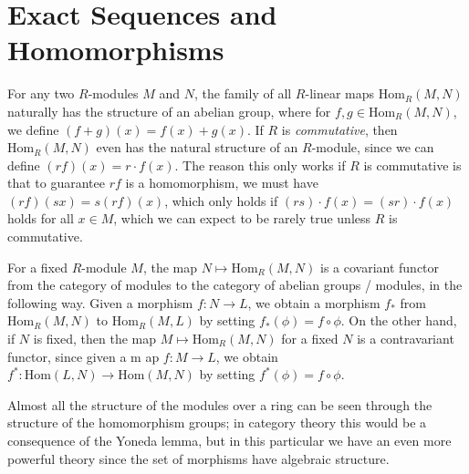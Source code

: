 \section{Exact Sequences and Homomorphisms}

For any two $R$-modules $M$ and $N$, the family of all $R$-linear maps $\text{Hom}_R(M,N)$ naturally has the structure of an abelian group, where for $f,g \in \text{Hom}_R(M,N)$, we define $(f + g)(x) = f(x) + g(x)$. If $R$ is \emph{commutative}, then $\text{Hom}_R(M,N)$ even has the natural structure of an $R$-module, since we can define $(rf)(x) = r \cdot f(x)$. The reason this only works if $R$ is commutative is that to guarantee $rf$ is a homomorphism, we must have $(rf)(sx) = s(rf)(x)$, which only holds if $(rs) \cdot f(x) = (sr) \cdot f(x)$ holds for all $x \in M$, which we can expect to be rarely true unless $R$ is commutative.

For a fixed $R$-module $M$, the map $N \mapsto \text{Hom}_R(M,N)$ is a covariant functor from the category of modules to the category of abelian groups / modules, in the following way. Given a morphism $f: N \to L$, we obtain a morphism $f_*$ from $\text{Hom}_R(M,N)$ to $\text{Hom}_R(M,L)$ by setting $f_*(\phi) = f \circ \phi$. On the other hand, if $N$ is fixed, then the map $M \mapsto \text{Hom}_R(M,N)$ for a fixed $N$ is a contravariant functor, since given a m ap $f:M \to L$, we obtain $f^*: \text{Hom}(L,N) \to \text{Hom}(M,N)$ by setting $f^*(\phi) = f \circ \phi$.

Almost all the structure of the modules over a ring can be seen through the structure of the homomorphism groups; in category theory this would be a consequence of the Yoneda lemma, but in this particular we have an even more powerful theory since the set of morphisms have algebraic structure.

